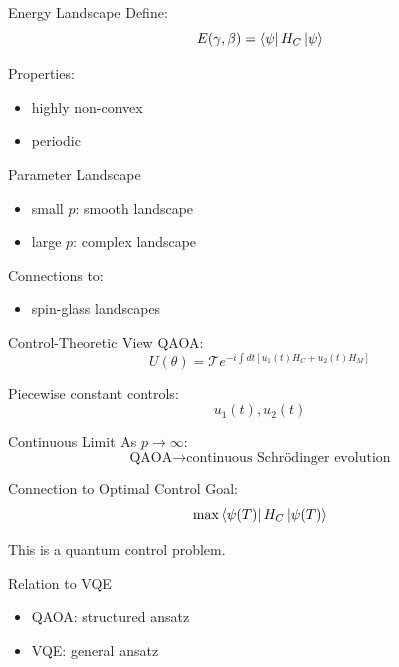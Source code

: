 \documentclass{beamer}
\begin{document}
\begin{frame}{Energy Landscape}
Define:
\[
E(\gamma,\beta)=\bra{\psi}H_C\ket{\psi}
\]

Properties:
\begin{itemize}
\item highly non-convex
\item periodic
\end{itemize}
\end{frame}

\begin{frame}{Parameter Landscape}
\begin{itemize}
\item small $p$: smooth landscape
\item large $p$: complex landscape
\end{itemize}

Connections to:
\begin{itemize}
\item spin-glass landscapes
\end{itemize}
\end{frame}

\begin{frame}{Control-Theoretic View}
QAOA:
\[
U(\theta)=\mathcal{T} e^{-i\int dt [u_1(t)H_C + u_2(t)H_M]}
\]

Piecewise constant controls:
\[
u_1(t), u_2(t)
\]
\end{frame}

\begin{frame}{Continuous Limit}
As $p\to\infty$:
\[
\text{QAOA} \to \text{continuous Schr\"odinger evolution}
\]
\end{frame}

\begin{frame}{Connection to Optimal Control}
Goal:
\[
\max \bra{\psi(T)}H_C\ket{\psi(T)}
\]

This is a quantum control problem.
\end{frame}

\begin{frame}{Relation to VQE}
\begin{itemize}
\item QAOA: structured ansatz
\item VQE: general ansatz
\end{itemize}
\end{frame}
\end{document}
